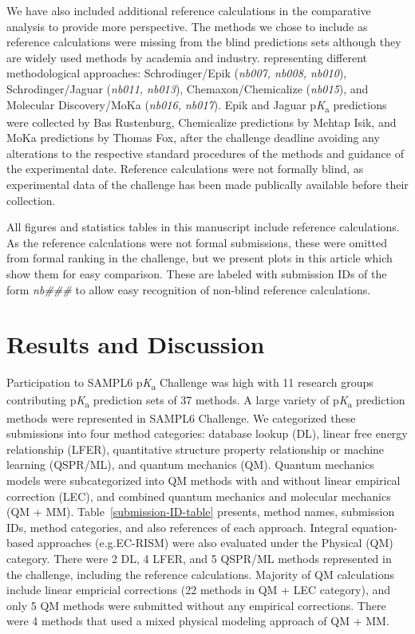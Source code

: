 \documentclass[9pt,lineno,final]{elife}
\newcommand{\pKa}{p\textit{K}\textsubscript{a}}
\begin{document}
We have also included additional reference calculations in the comparative analysis to provide more perspective. 
The methods we chose to include as reference calculations were missing from the blind predictions sets although they are widely used methods by academia and industry.
representing different methodological approaches: Schrodinger/Epik (\textit{nb007, nb008, nb010}), Schrodinger/Jaguar (\textit{nb011, nb013}), Chemaxon/Chemicalize (\textit{nb015}), and Molecular Discovery/MoKa (\textit{nb016, nb017}). Epik and Jaguar \pKa{} predictions were collected by Bas Rustenburg, Chemicalize predictions by Mehtap Isik, and MoKa predictions by Thomas Fox, after the challenge deadline avoiding any alterations to the respective standard procedures of the methods and guidance of the experimental date. 
Reference calculations were not formally blind, as experimental data of the challenge has been made publically available before their collection. 

All figures and statistics tables in this manuscript include reference calculations. 
As the reference calculations were not formal submissions, these were omitted from formal ranking in the challenge, but we present plots in this article which show them for easy comparison. These are labeled with submission IDs of the form \textit{nb\#\#\#} to allow easy recognition of non-blind reference calculations.

\section{Results and Discussion}


Participation to SAMPL6 \pKa{} Challenge was high with 11 research groups contributing \pKa{} prediction sets of 37 methods.  
A large variety of \pKa{} prediction methods were represented in SAMPL6 Challenge. 
We categorized these submissions into four method categories: database lookup (DL), linear free energy relationship (LFER), quantitative structure property relationship or machine learning (QSPR/ML), and quantum mechanics (QM). 
Quantum mechanics models were subcategorized into QM methods with and without linear empirical correction (LEC), and combined quantum mechanics and molecular mechanics (QM + MM). 
Table~\ref{submission-ID-table} presents, method names, submission IDs, method categories, and also references of each approach. 
Integral equation-based approaches (e.g.EC-RISM) were also evaluated under the Physical (QM) category. There were 2 DL, 4 LFER, and 5 QSPR/ML methods represented in the challenge, including the reference calculations. 
Majority of QM calculations include linear empricial corrections (22 methods in QM + LEC category), and only 5 QM methods were submitted without any empirical corrections. 
There were 4 methods that used a mixed physical modeling approach of QM + MM. 
\end{document}
